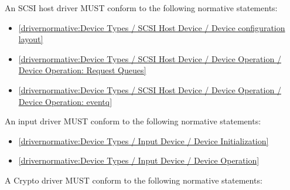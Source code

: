 \label{sec:Conformance / Driver Conformance / SCSI Host Driver Conformance}

An SCSI host driver MUST conform to the following normative statements:

\begin{itemize}
\item \ref{drivernormative:Device Types / SCSI Host Device / Device configuration layout}
\item \ref{drivernormative:Device Types / SCSI Host Device / Device Operation / Device Operation: Request Queues}
\item \ref{drivernormative:Device Types / SCSI Host Device / Device Operation / Device Operation: eventq}
\end{itemize}

\label{sec:Conformance / Driver Conformance / Input Driver Conformance}

An input driver MUST conform to the following normative statements:

\begin{itemize}
\item \ref{drivernormative:Device Types / Input Device / Device Initialization}
\item \ref{drivernormative:Device Types / Input Device / Device Operation}
\end{itemize}

\label{sec:Conformance / Driver Conformance / Crypto Driver Conformance}

A Crypto driver MUST conform to the following normative statements:

